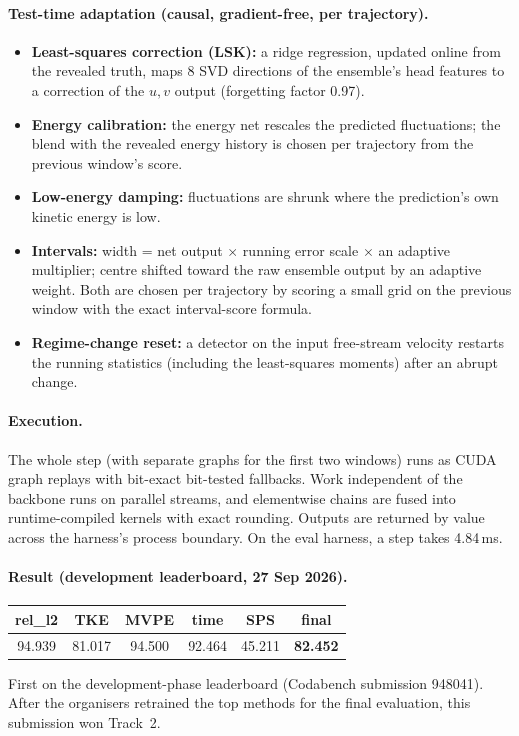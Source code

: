 \documentclass[10pt]{article}
\begin{document}
\paragraph{Test-time adaptation (causal, gradient-free, per trajectory).}
\begin{itemize}\itemsep1pt
\item \textbf{Least-squares correction (LSK):} a ridge regression, updated online from the revealed truth,
  maps 8 SVD directions of the ensemble's head features to a correction of the $u,v$ output (forgetting factor 0.97).
\item \textbf{Energy calibration:} the energy net rescales the predicted fluctuations; the blend with the
  revealed energy history is chosen per trajectory from the previous window's score.
\item \textbf{Low-energy damping:} fluctuations are shrunk where the prediction's own kinetic energy is low.
\item \textbf{Intervals:} width = net output $\times$ running error scale $\times$ an adaptive multiplier;
  centre shifted toward the raw ensemble output by an adaptive weight. Both are chosen per trajectory by
  scoring a small grid on the previous window with the exact interval-score formula.
\item \textbf{Regime-change reset:} a detector on the input free-stream velocity restarts the running
  statistics (including the least-squares moments) after an abrupt change.
\end{itemize}

\paragraph{Execution.} The whole step (with separate graphs for the first two windows) runs as CUDA graph
replays with bit-exact bit-tested fallbacks. Work independent of the backbone runs on parallel streams, and
elementwise chains are fused into runtime-compiled kernels with exact rounding. Outputs are returned by value
across the harness's process boundary. On the eval harness, a step takes 4.84\,ms.

\paragraph{Result (development leaderboard, 27 Sep 2026).}
\begin{center}
\begin{tabular}{cccccc}\toprule
rel\_l2 & TKE & MVPE & time & SPS & \textbf{final}\\\midrule
94.939 & 81.017 & 94.500 & 92.464 & 45.211 & \textbf{82.452}\\\bottomrule
\end{tabular}
\end{center}
First on the development-phase leaderboard (Codabench submission 948041). After the organisers retrained the top
methods for the final evaluation, this submission won Track~2.
\end{document}
